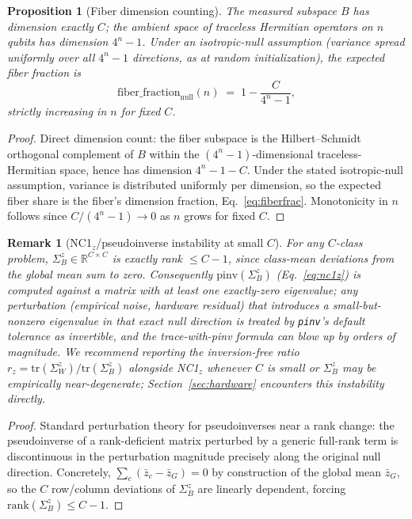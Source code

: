 \documentclass[pdflatex,sn-mathphys-ay]{sn-jnl}
\theoremstyle{thmstyleone}
\newtheorem{proposition}[theorem]{Proposition}
\theoremstyle{thmstyletwo}
\newtheorem{remark}{Remark}
\begin{document}
\begin{proposition}[Fiber dimension counting]
\label{prop:fiber}
The measured subspace $B$ has dimension exactly $C$; the ambient space of traceless Hermitian operators on $n$ qubits has dimension $4^n{-}1$. Under an isotropic-null assumption (variance spread uniformly over all $4^n{-}1$ directions, as at random initialization), the expected fiber fraction is
\begin{equation}
\mathrm{fiber\_fraction}_{\mathrm{null}}(n) \;=\; 1 - \frac{C}{4^n-1},
\label{eq:fiberfrac}
\end{equation}
strictly increasing in $n$ for fixed $C$.
\end{proposition}
\begin{proof}
Direct dimension count: the fiber subspace is the Hilbert--Schmidt orthogonal complement of $B$ within the $(4^n{-}1)$-dimensional traceless-Hermitian space, hence has dimension $4^n{-}1-C$. Under the stated isotropic-null assumption, variance is distributed uniformly per dimension, so the expected fiber share is the fiber's dimension fraction, Eq.~\ref{eq:fiberfrac}. Monotonicity in $n$ follows since $C/(4^n-1) \to 0$ as $n$ grows for fixed $C$.
\end{proof}

\begin{remark}[NC1$_z$/pseudoinverse instability at small $C$]
\label{rem:pinv}
For any $C$-class problem, $\Sigma_B^z \in \mathbb{R}^{C\times C}$ is \emph{exactly} rank $\le C-1$, since class-mean deviations from the global mean sum to zero. Consequently $\mathrm{pinv}(\Sigma_B^z)$ (Eq.~\ref{eq:nc1z}) is computed against a matrix with at least one exactly-zero eigenvalue; any perturbation (empirical noise, hardware residual) that introduces a small-but-nonzero eigenvalue in that exact null direction is treated by \texttt{pinv}'s default tolerance as invertible, and the trace-with-pinv formula can blow up by orders of magnitude. We recommend reporting the inversion-free ratio $r_z = \mathrm{tr}(\Sigma_W^z)/\mathrm{tr}(\Sigma_B^z)$ alongside NC1$_z$ whenever $C$ is small or $\Sigma_B^z$ may be empirically near-degenerate; Section~\ref{sec:hardware} encounters this instability directly.
\end{remark}
\begin{proof}
Standard perturbation theory for pseudoinverses near a rank change: the pseudoinverse of a rank-deficient matrix perturbed by a generic full-rank term is discontinuous in the perturbation magnitude precisely along the original null direction. Concretely, $\sum_c(\bar z_c-\bar z_G)=0$ by construction of the global mean $\bar z_G$, so the $C$ row/column deviations of $\Sigma_B^z$ are linearly dependent, forcing $\mathrm{rank}(\Sigma_B^z)\le C-1$.
\end{proof}
\end{document}
